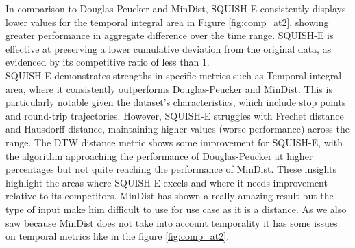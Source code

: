 In comparison to Douglas-Peucker and MinDist, SQUISH-E consistently displays lower values for the temporal integral area in Figure \ref{fig:comp_at2}, showing greater performance in aggregate difference over the time range. SQUISH-E is effective at preserving a lower cumulative deviation from the original data, as evidenced by its competitive ratio of less than 1.\\

SQUISH-E demonstrates strengths in specific metrics such as Temporal integral area, where it consistently outperforms Douglas-Peucker and MinDist. This is particularly notable given the dataset's characteristics, which include stop points and round-trip trajectories. However, SQUISH-E struggles with Frechet distance and Hausdorff distance, maintaining higher values (worse performance) across the range. The DTW distance metric shows some improvement for SQUISH-E, with the algorithm approaching the performance of Douglas-Peucker at higher percentages but not quite reaching the performance of MinDist. These insights highlight the areas where SQUISH-E excels and where it needs improvement relative to its competitors. MinDist has shown a really amazing result but the type of input make him difficult to use for use case as it is a distance. As we also saw because MinDist does not take into account temporality it has some issues on temporal metrics like in the figure \ref{fig:comp_at2}.

